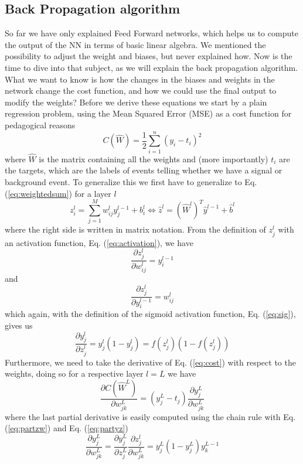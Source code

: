 \documentclass[12pt, a4paper]{book}
\begin{document}
\subsection{Back Propagation algorithm}
So far we have only explained Feed Forward networks, which helps us to compute the output of the NN in terms of basic linear algebra. We mentioned the possibility to adjust the weight and biases, but never explained how. 
Now is the time to dive into that subject, as we will explain the back propagation algorithm. What we want to know is how the changes in the biases and weights in the network change the cost function, and how we could use the final 
output to modify the weights? Before we derive these equations we start by a plain regression problem, using the Mean Squared Error (MSE) as a cost function for pedagogical reasons
\begin{equation}\label{eq:cost}
    C(\hat{W})=\frac{1}{2}\sum_{i=1}^n(y_i-t_i)^2
\end{equation}
where $\hat{W}$ is the matrix containing all the weights and (more importantly) $t_i$ are the targets, which are the labels of events telling whether we have a signal or background event. To generalize this we 
first have to generalize to Eq. (\ref{eq:weightedsum}) for a layer $l$
$$
    z_i^l=\sum_{j=1}^Mw^l_{ij}y^{l-1}_j + b^l_i \Leftrightarrow \hat{z}^l=\left(\hat{W}^l\right)^T\hat{y}^{l-1} + \hat{b}^l
$$
where the right side is written in matrix notation. From the definition of $z_j^l$ with an activation function, Eq. (\ref{eq:activation}), we have
\begin{equation}\label{eq:partzw}
    \frac{\partial z_j^l}{\partial w_{ij}^l} = y_i^{l-1}
\end{equation}
and
$$
\frac{\partial z_j^l}{\partial y_i^{l-1}} = w_{ij}^l
$$
which again, with the definition of the sigmoid activation function, Eq. (\ref{eq:sig}), gives us
\begin{equation}\label{eq:partyz}
    \frac{\partial y^l_j}{\partial z_j^{l}} = y_j^l(1-y_j^l)=f(z_j^l)(1-f(z_j^l))
\end{equation}
Furthermore, we need to take the derivative of Eq. (\ref{eq:cost}) with respect to the weights, doing so for a respective layer $l=L$ we have
$$
    \frac{\partial C(\hat W ^L) }{\partial w_{jk}^L}=\left(y_j^L-t_j\right)\frac{\partial y_j^L}{\partial w_{jk}^L}
$$
where the last partial derivative is easily computed using the chain rule with Eq. (\ref{eq:partzw}) and Eq. (\ref{eq:partyz})
$$
\frac{\partial y_j^L}{\partial w_{jk}^L} = \frac{\partial y^L_j}{\partial z_j^{L}}\frac{\partial z_j^l}{\partial w_{jk}^L} = y_j^L(1-y_j^L)y_k^{L-1}
$$
\end{document}
